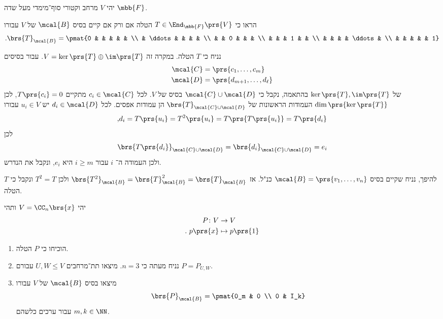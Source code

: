 \documentclass[a4paper,10pt,twoside,openany]{book}
\begin{document}
\begin{exercisechap}
יהי
$V$
מרחב וקטורי סוף־מימדי מעל שדה
$\mbb{F}$.

הראו כי
$T \in \End_{\mbb{F}}\prs{V}$
הטלה אם ורק אם קיים בסיס
$\mcal{B}$
של
$V$
עבורו
\[\text{.} \brs{T}_{\mcal{B}} = \pmat{0 & & & & & \\ & \ddots & & & & \\ & & 0 & & & \\ & & & 1 & & \\ & & & & \ddots & \\ & & & & & 1}\] 
\end{exercisechap}

\begin{solution}
נניח כי
$T$
הטלה. במקרה זה
$V = \ker\prs{T} \oplus \im\prs{T}$.
עבור בסיסים
\begin{align*}
\mcal{C} &= \prs{c_1, \ldots, c_m} \\
\mcal{D} &= \prs{d_{m+1}, \ldots, d_\ell}
\end{align*}
של
$\ker\prs{T}, \im\prs{T}$
בהתאמה, נקבל כי
$\mcal{C} \cup \mcal{D}$
בסיס של
$V$.
לכל
$c_i \in \mcal{C}$
מתקיים
$T\prs{c_i} = 0$,
לכן
$\dim\prs{\ker\prs{T}}$
העמודות הראשונות של
$\brs{T}_{\mcal{C} \cup \mcal{D}}$
הן עמודות אפסים.
לכל
$d_i \in \mcal{D}$
יש
$u_i \in V$
עבורו
\[\text{,} d_i = T\prs{u_i} = T^2\prs{u_i} = T\prs{T\prs{u_i}} = T\prs{d_i}\]
לכן
\[\brs{T\prs{d_i}}_{\mcal{C} \cup \mcal{D}} = \brs{d_i}_{\mcal{C} \cup \mcal{D}} = e_i\]
ולכן העמודה ה־%
$i$
עבור
$i \geq m$
היא
$e_i$,
ונקבל את הנדרש.

להיפך, נניח שקיים בסיס
$\mcal{B} = \prs{v_1, \ldots, v_n}$
כנ"ל. אז
$\brs{T^2}_\mcal{B} = \brs{T}_{\mcal{B}}^2 = \brs{T}_\mcal{B}$
ולכן
$T^2 = T$
ונקבל כי
$T$
הטלה.
\end{solution}

\begin{exercisechap}
יהי
$V = \CC_n\brs{x}$
ותהי
\begin{align*}
P \colon V &\to V \\
\text{.} \hphantom{l} p\prs{x} &\mapsto p\prs{1}
\end{align*}

\begin{enumerate}
\item הוכיחו כי
$P$
הטלה.

\item
נניח מעתה כי
$n = 3$.
מיצאו תת־מרחבים
$U,W \leq V$
עבורם
$P = P_{U,W}$.

\item מיצאו בסיס
$\mcal{B}$
של
$V$
עבורו
\[\brs{P}_{\mcal{B}} = \pmat{0_m & 0 \\ 0 & I_k}\]
עבור ערכים כלשהם
$m,k \in \NN$.
\end{enumerate}
\end{exercisechap}
\end{document}
